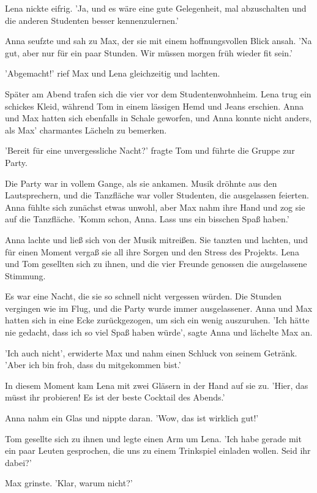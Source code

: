 \documentclass[12pt]{article}
\begin{document}
Lena nickte eifrig. 'Ja, und es wäre eine gute Gelegenheit, mal abzuschalten und die anderen Studenten besser kennenzulernen.'

Anna seufzte und sah zu Max, der sie mit einem hoffnungsvollen Blick ansah. 'Na gut, aber nur für ein paar Stunden. Wir müssen morgen früh wieder fit sein.'

'Abgemacht!' rief Max und Lena gleichzeitig und lachten.

Später am Abend trafen sich die vier vor dem Studentenwohnheim. Lena trug ein schickes Kleid, während Tom in einem lässigen Hemd und Jeans erschien. Anna und Max hatten sich ebenfalls in Schale geworfen, und Anna konnte nicht anders, als Max' charmantes Lächeln zu bemerken.

'Bereit für eine unvergessliche Nacht?' fragte Tom und führte die Gruppe zur Party.

Die Party war in vollem Gange, als sie ankamen. Musik dröhnte aus den Lautsprechern, und die Tanzfläche war voller Studenten, die ausgelassen feierten. Anna fühlte sich zunächst etwas unwohl, aber Max nahm ihre Hand und zog sie auf die Tanzfläche. 'Komm schon, Anna. Lass uns ein bisschen Spaß haben.'

Anna lachte und ließ sich von der Musik mitreißen. Sie tanzten und lachten, und für einen Moment vergaß sie all ihre Sorgen und den Stress des Projekts. Lena und Tom gesellten sich zu ihnen, und die vier Freunde genossen die ausgelassene Stimmung.

Es war eine Nacht, die sie so schnell nicht vergessen würden. Die Stunden vergingen wie im Flug, und die Party wurde immer ausgelassener. Anna und Max hatten sich in eine Ecke zurückgezogen, um sich ein wenig auszuruhen. 'Ich hätte nie gedacht, dass ich so viel Spaß haben würde', sagte Anna und lächelte Max an.

'Ich auch nicht', erwiderte Max und nahm einen Schluck von seinem Getränk. 'Aber ich bin froh, dass du mitgekommen bist.'

In diesem Moment kam Lena mit zwei Gläsern in der Hand auf sie zu. 'Hier, das müsst ihr probieren! Es ist der beste Cocktail des Abends.'

Anna nahm ein Glas und nippte daran. 'Wow, das ist wirklich gut!'

Tom gesellte sich zu ihnen und legte einen Arm um Lena. 'Ich habe gerade mit ein paar Leuten gesprochen, die uns zu einem Trinkspiel einladen wollen. Seid ihr dabei?'

Max grinste. 'Klar, warum nicht?'
\end{document}
